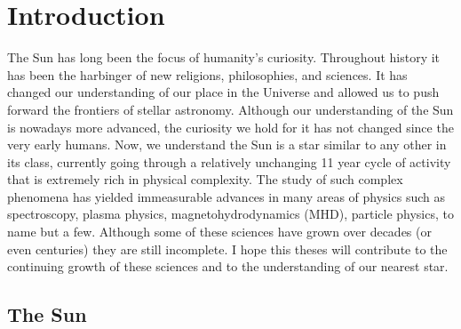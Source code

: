 \singlespacing
\chapter{Introduction}
\label{chap:1}
\doublespacing
The Sun has long been the focus of humanity's curiosity. Throughout history it has been the harbinger of new religions, philosophies, and sciences. It has changed our understanding of our place in the Universe and allowed us to push forward the frontiers of stellar astronomy. Although our understanding of the Sun is nowadays more advanced, the curiosity we hold for it has not changed since the very early humans.
Now, we understand the Sun is a star similar to any other in its class, currently going through a relatively unchanging 11 year cycle of activity that is extremely rich in physical complexity. The study of such complex phenomena has yielded immeasurable advances in many areas of physics such as spectroscopy, plasma physics, magnetohydrodynamics (MHD), particle physics, to name but a few. Although some of these sciences have grown over decades (or even centuries) they are still incomplete. I hope this theses will contribute to the continuing growth of these sciences and to the understanding of our nearest star.


\section{The Sun}\label{sec:1}

